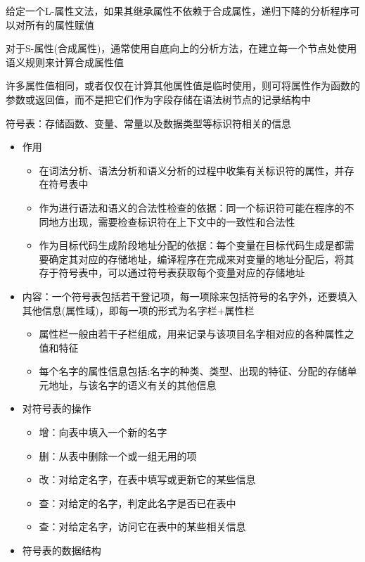 \documentclass[utf8]{ctexart}
\begin{document}
给定一个L-属性文法，如果其继承属性不依赖于合成属性，递归下降的分析程序可以对所有的属性赋值

对于S-属性(合成属性)，通常使用自底向上的分析方法，在建立每一个节点处使用语义规则来计算合成属性值

许多属性值相同，或者仅仅在计算其他属性值是临时使用，则可将属性作为函数的参数或返回值，而不是把它们作为字段存储在语法树节点的记录结构中

符号表：存储函数、变量、常量以及数据类型等标识符相关的信息
\begin{itemize}
    \item 作用
    \begin{itemize}
        \item 在词法分析、语法分析和语义分析的过程中收集有关标识符的属性，并存在符号表中
        \item 作为进行语法和语义的合法性检查的依据：同一个标识符可能在程序的不同地方出现，需要检查标识符在上下文中的一致性和合法性
        \item 作为目标代码生成阶段地址分配的依据：每个变量在目标代码生成是都需要确定其对应的存储地址，编译程序在完成来对变量的地址分配后，将其存于符号表中，可以通过符号表获取每个变量对应的存储地址
    \end{itemize}
    \item 内容：一个符号表包括若干登记项，每一项除来包括符号的名字外，还要填入其他信息(属性域)，即每一项的形式为名字栏+属性栏
    \begin{itemize}
        \item 属性栏一般由若干子栏组成，用来记录与该项目名字相对应的各种属性之值和特征
        \item 每个名字的属性信息包括:名字的种类、类型、出现的特征、分配的存储单元地址，与该名字的语义有关的其他信息
    \end{itemize} 
    \item 对符号表的操作
    \begin{itemize}
        \item 增：向表中填入一个新的名字
        \item 删：从表中删除一个或一组无用的项
        \item 改：对给定名字，在表中填写或更新它的某些信息
        \item 查：对给定的名字，判定此名字是否已在表中
        \item 查：对给定名字，访问它在表中的某些相关信息
    \end{itemize}  
    \item 符号表的数据结构
    \begin{itemize}

\end{itemize}
\end{itemize}
\end{document}

